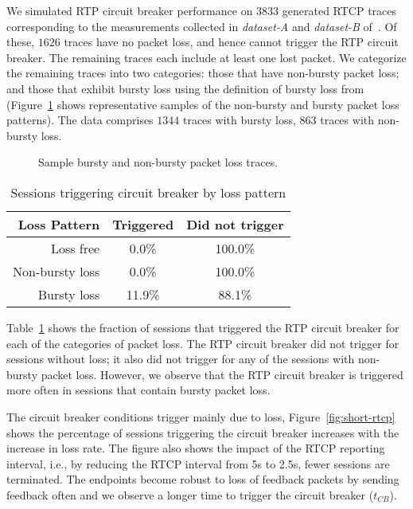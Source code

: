 We simulated RTP circuit breaker performance on $3833$ generated RTCP traces
corresponding to the measurements collected in \emph{dataset-A} and
\emph{dataset-B} of~\cite{ellis:2011:dataset}. Of these, $1626$ traces have no
packet loss, and hence cannot trigger the RTP circuit breaker. The remaining
traces each include at least one lost packet. We categorize the remaining
traces into two categories: those that have non-bursty packet loss; and those
that exhibit bursty loss using the definition of bursty loss
from~\cite{rfc3611} (Figure~\ref{fig:bursty} shows representative samples of
the non-bursty and bursty packet loss patterns). The data comprises $1344$
traces with bursty loss, $863$ traces with non-bursty loss.

\begin{figure}
  \centerline{
  }
  \caption{Sample bursty and non-bursty packet loss traces.}
  \label{fig:bursty}
\end{figure}

\begin{table}
  \begin{center}
    \begin{tabular}{rcc}
    \toprule
    Loss Pattern       & Triggered & Did not trigger \\
    \midrule
             Loss free &   0.0\% & 100.0\% \\
       Non-bursty loss &   0.0\% & 100.0\% \\
          Bursty loss  &  11.9\% &  88.1\% \\
    \bottomrule
    \end{tabular}
    \caption{Sessions triggering circuit breaker by loss pattern}
    \label{tab:cb_bursty}
  \end{center}
\end{table}

Table~\ref{tab:cb_bursty} shows the fraction of sessions that triggered the
RTP circuit breaker for each of the categories of packet loss. The RTP circuit
breaker did not trigger for sessions without loss; it also did not trigger for
any of the sessions with non-bursty packet loss. However, we observe that the
RTP circuit breaker is triggered more often in sessions that contain bursty
packet loss.


The circuit breaker conditions trigger mainly due to loss,
Figure~\ref{fig:short-rtcp} shows the percentage of sessions triggering the
circuit breaker increases with the increase in loss rate. The figure also
shows the impact of the RTCP reporting interval, i.e., by reducing the RTCP
interval from 5s to 2.5s, fewer sessions are terminated. The endpoints become
robust to loss of feedback packets by sending feedback often and we observe
a longer time to trigger the circuit breaker ($t_{CB}$).

